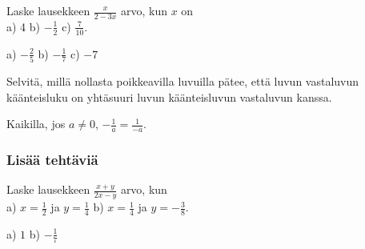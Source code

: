 \begin{tehtavasivu}
\begin{tehtava}
Laske lausekkeen $\frac{x}{2-3x}$ arvo, kun $x$ on \\ a) 4 \qquad b) $-\frac{1}{2}$ \qquad c) $\frac{7}{10}$.
\begin{vastaus}
a) $-\frac{2}{5}$ \qquad b) $-\frac{1}{7}$ \qquad c) $-7$
\end{vastaus}
\end{tehtava}

\begin{tehtava}
Selvitä, millä nollasta poikkeavilla luvuilla pätee, että luvun vastaluvun käänteisluku on yhtäsuuri luvun käänteisluvun vastaluvun kanssa.
\begin{vastaus}
Kaikilla, jos $a \neq 0$, $-\frac{1}{a} = \frac{1}{-a}$.
\end{vastaus}
\end{tehtava}

\subsubsection*{Lisää tehtäviä}

\begin{tehtava}
Laske lausekkeen $\frac{x+y}{2x-y}$ arvo, kun \\ a) $x=\frac{1}{2}$ ja $y= \frac{1}{4}$ \qquad b) $x=\frac{1}{4}$ ja $y= -\frac{3}{8}$.
\begin{vastaus}
a) $1$ \qquad b) $-\frac{1}{7}$
\end{vastaus}
\end{tehtava}


 
    
        \begin{tehtava}
            \begin{alakohdat}
            \end{alakohdat}
            \begin{vastaus}
        		\begin{alakohdat}
        		\end{alakohdat}
            \end{vastaus}
        \end{tehtava}
        

\end{tehtavasivu}
